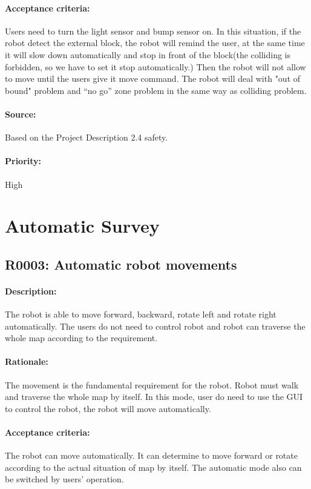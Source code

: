 \documentclass[11pt, a4paper]{report}
\begin{document}
\paragraph{Acceptance criteria:}
Users need to turn the light sensor and bump sensor on. In this situation, if the robot detect the external block, the robot will remind the user, at the same time it will slow down automatically and stop in front of the block(the colliding is forbidden, so we have to set it stop automatically.) Then the robot will not allow to move until the users give it move command. The robot will deal with "out of bound" problem and “no go” zone problem in the same way as colliding problem.
\paragraph{Source:}
Based on the Project Description 2.4 safety.   
\paragraph{Priority:}
High


\section{Automatic Survey}
\subsection{R0003: Automatic robot movements }
\paragraph{Description:}
The robot is able to move forward, backward, rotate left and rotate right automatically. The users do not need to control robot and robot can traverse the whole map according to the requirement.
\paragraph{Rationale:}
The movement is the fundamental requirement for the robot. Robot must walk and traverse the whole map by itself. In this mode, user do need to use the GUI to control the robot, the robot will move automatically.    
\paragraph{Acceptance criteria:}
The robot can move automatically. It can determine to move forward or rotate according to the actual situation of map by itself. The automatic mode also can be switched by users' operation.  
\end{document}
